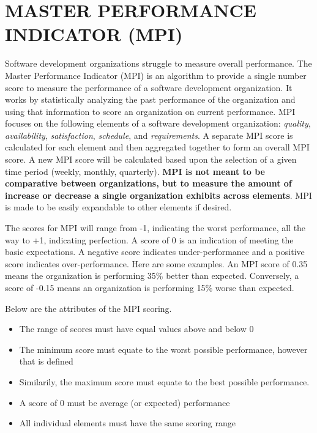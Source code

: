 \documentclass[SDSUThesis.tex]{subfiles}
\begin{document}
\section{MASTER PERFORMANCE INDICATOR (MPI)}

    Software development organizations struggle to measure overall performance.  
    The Master Performance Indicator (MPI) is an algorithm to provide a single 
    number score to measure the performance of a software development organization. 
    It works by statistically analyzing the past performance of the 
    organization and using that information to score an organization 
    on current performance.  MPI focuses on the following 
    elements of a software development organization: \textit{quality}, 
    \textit{availability}, \textit{satisfaction}, \textit{schedule},
    and \textit{requirements}. A separate MPI
    score is calculated for each element and 
    then aggregated together to form an overall 
    MPI score.  A new MPI score will be calculated based
    upon the selection of a given time period (weekly, monthly, quarterly).
    \textbf{MPI is not meant to be comparative between
    organizations, but to measure the amount of increase or decrease
    a single organization exhibits across elements}.  MPI is made to be easily 
    expandable to other elements if desired.
    
    The scores for MPI will range from -1, indicating the worst 
    performance, all the way to +1, indicating perfection.
    A score of 0 is an indication of meeting the basic expectations. 
    A negative score indicates under-performance and a 
    positive score indicates over-performance.   Here are some 
    examples. An MPI score of 0.35 means the organization is 
    performing 35\% better than expected.  Conversely, a score 
    of -0.15 means an organization is performing 15\% worse than expected.  

    Below are the attributes of the MPI scoring.
    \begin{itemize}
        \item The range of scores must have equal values above and below 0
        \item The minimum score must equate to the worst possible 
            performance, however that is defined
        \item Similarily, the maximum score must equate to the best possible performance.  
        \item A score of 0 must be average (or expected) performance
        \item All individual elements must have the same scoring range
    \end{itemize}
            
\end{document}
